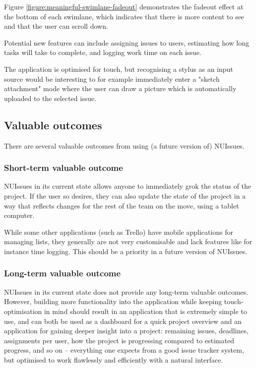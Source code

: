 Figure \ref{figure:meaningful-swimlane-fadeout} demonstrates the fadeout effect at the bottom of each swimlane, which indicates that there is more content to see and that the user can scroll down.

Potential new features can include assigning issues to users, estimating how long tasks will take to complete, and logging work time on each issue.

The application is optimised for touch, but recognising a stylus as an input source would be interesting to for example immediately enter a "sketch attachment" mode where the user can draw a picture which is automatically uploaded to the selected issue.

\subsection{Valuable outcomes}

There are several valuable outcomes from using (a future version of) NUIssues.

\subsubsection{Short-term valuable outcome}

NUIssues in its current state allows anyone to immediately grok the status of the project. If the user so desires, they can also update the state of the project in a way that reflects changes for the rest of the team on the move, using a tablet computer.

While some other applications (such as Trello) have mobile applications for managing lists, they generally are not very customisable and lack features like for instance time logging. This should be a priority in a future version of NUIssues.

\subsubsection{Long-term valuable outcome}

NUIssues in its current state does not provide any long-term valuable outcomes. However, building more functionality into the application while keeping touch-optimisation in mind should result in an application that is extremely simple to use, and can both be used as a dashboard for a quick project overview and an application for gaining deeper insight into a project: remaining issues, deadlines, assignments per user, how the project is progressing compared to estimated progress, and so on -- everything one expects from a good issue tracker system, but optimised to work flawlessly and efficiently with a natural interface.

